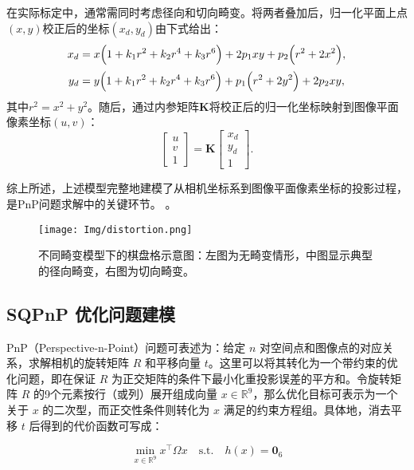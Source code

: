在实际标定中，通常需同时考虑径向和切向畸变。将两者叠加后，归一化平面上点$(x,y)$校正后的坐标$(x_d,y_d)$由下式给出：
\begin{equation}
	\begin{aligned}
		x_{d} &= x\Bigl(1 + k_1r^2 + k_2r^4 + k_3r^6\Bigr)
		+ 2p_1 xy + p_2\Bigl(r^2 + 2x^2\Bigr),\\[2pt]
		y_{d} &= y\Bigl(1 + k_1r^2 + k_2r^4 + k_3r^6\Bigr)
		+ p_1\Bigl(r^2 + 2y^2\Bigr) + 2p_2 xy,
	\end{aligned}
	\label{eq:comprehensive_distortion}
\end{equation}
其中$r^2=x^2+y^2$。随后，通过内参矩阵$\mathbf{K}$将校正后的归一化坐标映射到图像平面像素坐标$(u,v)$：
\begin{equation}
	\begin{bmatrix}
		u \\[2pt]
		v \\[2pt]
		1
	\end{bmatrix}
	=
	\mathbf{K}
	\begin{bmatrix}
		x_d \\[2pt]
		y_d \\[2pt]
		1
	\end{bmatrix}.
\end{equation}

综上所述，上述模型完整地建模了从相机坐标系到图像平面像素坐标的投影过程，是PnP问题求解中的关键环节。
。		
\begin{figure}[htbp]
	\centering
	\texttt{[image: Img/distortion.png]}
	\caption{不同畸变模型下的棋盘格示意图：左图为无畸变情形，中图显示典型的径向畸变，右图为切向畸变。}
	\label{fig:distortion_patterns}
\end{figure}

\subsection{SQPnP 优化问题建模}
PnP（Perspective-n-Point）问题可表述为：给定 $n$ 对空间点和图像点的对应关系，求解相机的旋转矩阵 $R$ 和平移向量 $t$。这里可以将其转化为一个带约束的优化问题，即在保证 $R$ 为正交矩阵的条件下最小化重投影误差的平方和。令旋转矩阵 $R$ 的9个元素按行（或列）展开组成向量 $x \in \mathbb{R}^9$，那么优化目标可表示为一个关于 $x$ 的二次型，而正交性条件则转化为 $x$ 满足的约束方程组。具体地，消去平移 $t$ 后得到的代价函数可写成：

\begin{equation}
	\min_{x \in \mathbb{R}^9}   x^\top \Omega x
	\quad \text{s.t.} \quad
	h(x) = \mathbf{0}_6
\end{equation}

